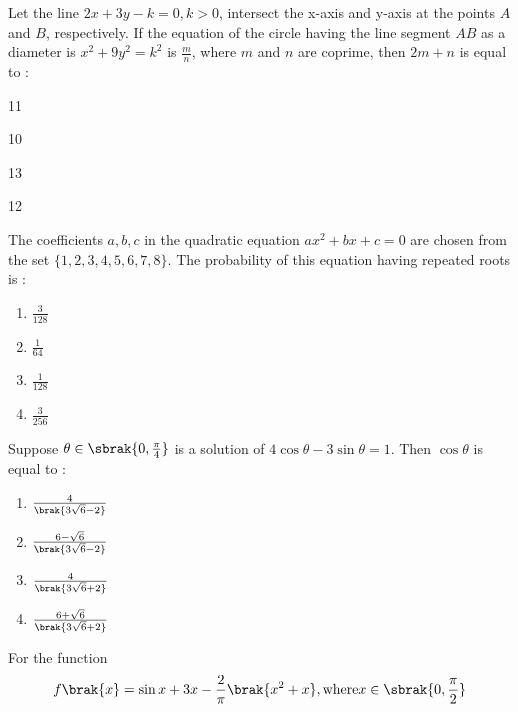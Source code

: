 	\item Let the line $2x + 3y - k = 0, k > 0$, intersect the x-axis and y-axis at the points 
        $A$ and $B$, respectively. If the equation of the circle having the line segment $AB$ as
        a diameter is $x^2 + 9y^2 = k^2$ is $\frac{m}{n}$, where $m$ and $n$ are coprime, then
        $2m + n$ is equal to :
		\hfill{}
		\begin{enumerate}
                \begin{multicols}{4}
			\item 11 \columnbreak 
			\item 10 \columnbreak
			\item 13 \columnbreak
			\item 12  
                \end{multicols}
		\end{enumerate}
	\item
        The coefficients $a, b, c$ in the quadratic equation $ax^2 + bx +c = 0$ are chosen from the 
        set $\{ 1, 2 , 3, 4, 5, 6, 7, 8\}$. The probability of this equation having repeated roots is :
		\hfill{\brak{2024-Apr}}
		\begin{multicols}{4}
		\begin{enumerate}
            \item $\frac{3}{128}$ \columnbreak
            \item $\frac{1}{64}$ \columnbreak
            \item $\frac{1}{128}$ \columnbreak
            \item $\frac{3}{256}$
		\end{enumerate}
	\end{multicols}
\item Suppose $\theta \in \sbrak{0, \frac{\pi}{4}}$ is a solution of $4\cos \theta - 3 \sin \theta = 1$. 
    Then $\cos \theta$ is equal to :
		\hfill{\brak{2024-Apr}}
		\begin{enumerate}
            \item $\frac{4}{\brak{3\sqrt{6} - 2}}$ 
            \item $\frac{6 - \sqrt{6}}{\brak{3\sqrt{6} - 2}}$ 
            \item $\frac{4}{\brak{3\sqrt{6} + 2}}$ 
            \item $\frac{6 + \sqrt{6}}{\brak{3\sqrt{6} + 2}}$ 
		\end{enumerate}
\item
    For the function
	\begin{align}
        f\brak{x} = \sin x + 3x - \frac{2}{\pi}\brak{x^2 + x}, \textnormal{where} x \in \sbrak{0, \frac{\pi}{2}}
	\end{align} 
